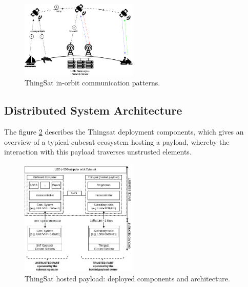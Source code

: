 \begin{figure}[t]
    \centering
    \includegraphics[width=0.5\textwidth]{Figures/thingsat-dtn.png}
    \caption{ThingSat in-orbit communication patterns.}
    \label{fig:thingsat-comm}
\end{figure}



\subsection{Distributed System Architecture}

The figure \ref{fig:thingsat-archi} describes the Thingsat deployment components, which gives an
overview of a typical cubesat ecosystem hosting a payload, whereby the interaction with this payload traverses unstrusted elements.

\begin{figure}[ht]
    \includegraphics[width=0.5\textwidth]{Figures/globecom-thingsat-mods.jpg}
    \caption{ThingSat hosted payload: deployed components and architecture.}
    \label{fig:thingsat-archi}
\end{figure}

